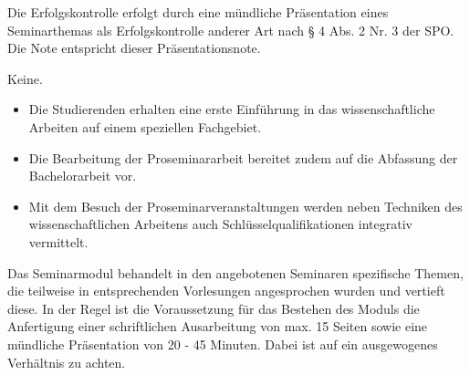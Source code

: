 \begin{course}

\setdoclanguagegerman
{}



\coursehead


\label{cour_8399.dp_997}


\begin{styleenv}
\begin{assessment}
Die Erfolgskontrolle erfolgt durch eine mündliche Präsentation eines Seminarthemas als Erfolgskontrolle anderer Art nach § 4 Abs. 2 Nr. 3 der SPO. Die Note entspricht dieser Präsentationsnote.


\end{assessment}

\begin{conditions}Keine.\end{conditions}


\end{styleenv}

\begin{learningoutcomes}
\begin{itemize}\item Die Studierenden erhalten eine erste Einführung in das wissenschaftliche Arbeiten auf einem speziellen Fachgebiet.  \item Die Bearbeitung der Proseminararbeit bereitet zudem auf die Abfassung der Bachelorarbeit vor.  \item Mit dem Besuch der Proseminarveranstaltungen werden neben Techniken des wissenschaftlichen Arbeitens auch Schlüsselqualifikationen integrativ vermittelt.  \end{itemize}
\end{learningoutcomes}

\begin{content}
Das Seminarmodul behandelt in den angebotenen Seminaren spezifische Themen, die teilweise in entsprechenden Vorlesungen angesprochen wurden und vertieft diese. In der Regel ist die Voraussetzung für das Bestehen des Moduls die Anfertigung einer schriftlichen Ausarbeitung von max. 15 Seiten sowie eine mündliche Präsentation von 20 - 45 Minuten. Dabei ist auf ein ausgewogenes Verhältnis zu achten.


\end{content}







\end{course}